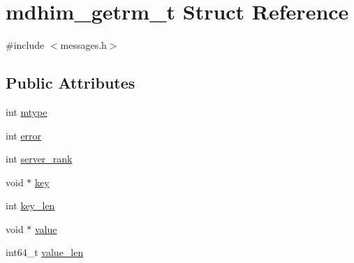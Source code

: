 \hypertarget{structmdhim__getrm__t}{\section{mdhim\-\_\-getrm\-\_\-t Struct Reference}
\label{d5/dfb/structmdhim__getrm__t}
}


{\ttfamily \#include $<$messages.\-h$>$}

\subsection*{Public Attributes}
\begin{DoxyCompactItemize}
\item 
int \hyperlink{structmdhim__getrm__t_af7c9cb5700c74dae330d00dcb53306a8}{mtype}
\item 
int \hyperlink{structmdhim__getrm__t_ab5a0bbbc5c249097b7ea3c71a8c59be9}{error}
\item 
int \hyperlink{structmdhim__getrm__t_ab7e6c3fdb4ba044166a37bf1e178b334}{server\-\_\-rank}
\item 
void $\ast$ \hyperlink{structmdhim__getrm__t_a03ac590954131b0bd04b767115b011d2}{key}
\item 
int \hyperlink{structmdhim__getrm__t_a91f0d874ba5b81f1d22a791f4936653c}{key\-\_\-len}
\item 
void $\ast$ \hyperlink{structmdhim__getrm__t_ae1e2ce047de1164dcdb1bcfe0f6fd0ae}{value}
\item 
int64\-\_\-t \hyperlink{structmdhim__getrm__t_aecda310ffb073b7d783fd52beee37d51}{value\-\_\-len}
\end{DoxyCompactItemize}


